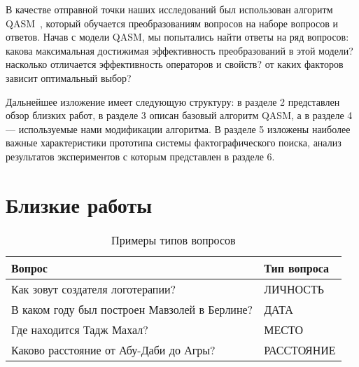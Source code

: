 \documentclass{article}
\begin{document}
В качестве отправной точки наших исследований был использован алгоритм 
QASM~\cite{qa:radev:qasm}, который
обучается преобразованиям вопросов на наборе вопросов и ответов.
Начав с модели QASM, мы попытались найти ответы на ряд вопросов:
какова максимальная достижимая эффективность преобразований в этой
модели? насколько отличается эффективность операторов и свойств? 
от каких факторов зависит оптимальный выбор?

Дальнейшее изложение имеет следующую структуру:
в разделе 2 представлен обзор близких работ,
в разделе 3 описан базовый алгоритм QASM, 
а в разделе 4 --- используемые нами модификации алгоритма.
В разделе 5 изложены наиболее важные характеристики 
прототипа системы фактографического поиска,
анализ результатов экспериментов с которым представлен в разделе 6.


\section{Близкие работы}

\begin{table*}
\begin{center}
\begin{tabular}{|l|l|}
\hline
Вопрос & Тип вопроса \\
\hline
Как зовут создателя логотерапии? & ЛИЧНОСТЬ \\
В каком году был построен Мавзолей в Берлине? & ДАТА \\
Где находится Тадж Махал? & МЕСТО \\
Каково расстояние от Абу-Даби до Агры? & РАССТОЯНИЕ \\
\hline
\end{tabular}
\caption{Примеры типов вопросов}
\label{table:qtypes}
\end{center}
\end{table*}
\end{document}
